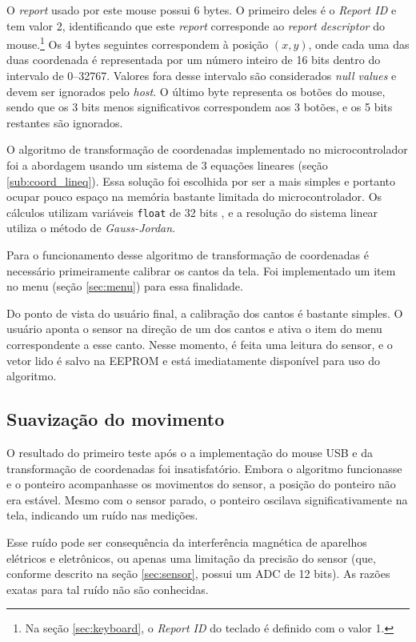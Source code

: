 \documentclass[brazil,pagestart=firstchapter]{abnt}
\begin{document}
O \textit{report} usado por este mouse possui 6 bytes. O primeiro deles é
o \textit{Report ID} e tem valor 2, identificando que este \textit{report}
corresponde ao \textit{report descriptor} do mouse.\footnote{
	Na seção \ref{sec:keyboard}, o \textit{Report ID} do teclado é definido
	com o valor 1.
} Os 4 bytes seguintes correspondem à posição $(x, y)$, onde cada uma das
duas coordenada é representada por um número inteiro de 16 bits dentro do
intervalo de \numrange{0}{32767}. Valores fora desse intervalo são
considerados \textit{null values} e devem ser ignorados pelo \textit{host}.
\cite[p.~20]{usbhid} O último byte representa os botões do mouse, sendo que
os 3 bits menos significativos correspondem aos 3 botões, e os 5 bits
restantes são ignorados.

O algoritmo de transformação de coordenadas implementado no microcontrolador
foi a abordagem usando um sistema de 3 equações lineares (seção
\ref{sub:coord_lineq}). Essa solução foi escolhida por ser a mais simples e
portanto ocupar pouco espaço na memória bastante limitada do
microcontrolador. Os cálculos utilizam variáveis \texttt{float} de 32 bits
\cite{avrlibcfaq}, e a resolução do sistema linear utiliza o método de
\textit{Gauss-Jordan}.

Para o funcionamento desse algoritmo de transformação de coordenadas é
necessário primeiramente calibrar os cantos da tela. Foi implementado um
item no menu (seção \ref{sec:menu}) para essa finalidade.

Do ponto de vista do usuário final, a calibração dos cantos é bastante
simples. O usuário aponta o sensor na direção de um dos cantos e ativa o
item do menu correspondente a esse canto. Nesse momento, é feita uma leitura
do sensor, e o vetor lido é salvo na \ac{EEPROM} e está imediatamente
disponível para uso do algoritmo.

\subsection{Suavização do movimento}
\label{sub:mouse_smoothing}

O resultado do primeiro teste após o a implementação do mouse \ac{USB} e da
transformação de coordenadas foi insatisfatório. Embora o algoritmo
funcionasse e o ponteiro acompanhasse os movimentos do sensor, a posição do
ponteiro não era estável. Mesmo com o sensor parado, o ponteiro oscilava
significativamente na tela, indicando um ruído nas medições.

Esse ruído pode ser consequência da interferência magnética de aparelhos
elétricos e eletrônicos, ou apenas uma limitação da precisão do sensor (que,
conforme descrito na seção \ref{sec:sensor}, possui um \ac{ADC} de 12 bits).
As razões exatas para tal ruído não são conhecidas.
\end{document}

